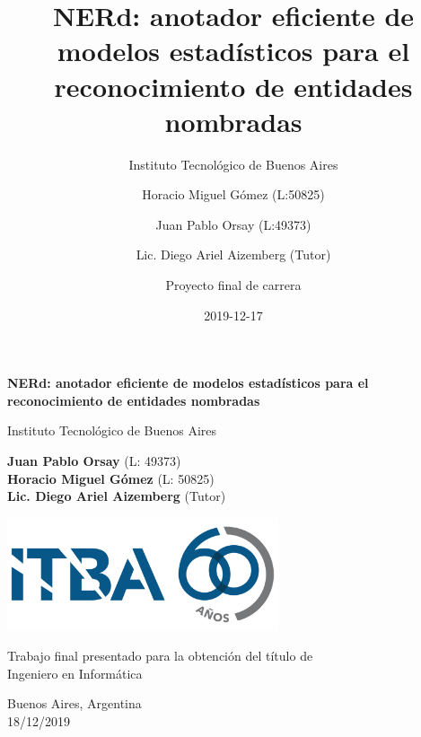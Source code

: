 \documentclass[12pt,a4paper,]{scrartcl}
\title{NERd: anotador eficiente de modelos estadísticos para el reconocimiento de entidades nombradas}
\subtitle{Instituto Tecnológico de Buenos Aires}
\author{Horacio Miguel Gómez (L:50825) \and Juan Pablo Orsay (L:49373) \and Lic. Diego Ariel Aizemberg (Tutor) \and Proyecto final de carrera}
\date{2019-12-17}
\let\oldmaketitle\maketitle
\begin{document}
\maketitle

\begin{titlepage}
    \begin{center}
        \vspace*{1cm}

        \Huge
        \textbf{NERd: anotador eficiente de modelos estadísticos para el reconocimiento de entidades nombradas}

        \vspace{0.5cm}
        \LARGE
        Instituto Tecnológico de Buenos Aires

        \vspace{1.5cm}

        \textbf{Juan Pablo Orsay} (L: 49373)\\
        \textbf{Horacio Miguel Gómez} (L: 50825)\\
        \textbf{Lic. Diego Ariel Aizemberg} (Tutor)

        \vfill

        \includegraphics[width=0.6\textwidth]{assets/logoItba}

        \vspace{0.8cm}

        Trabajo final presentado para la obtención del título de\\
        Ingeniero en Informática

        \vspace{0.8cm}

        \Large
        Buenos Aires, Argentina\\
        18/12/2019

    \end{center}
\end{titlepage}

\let\maketitle\oldmaketitle
\end{document}
